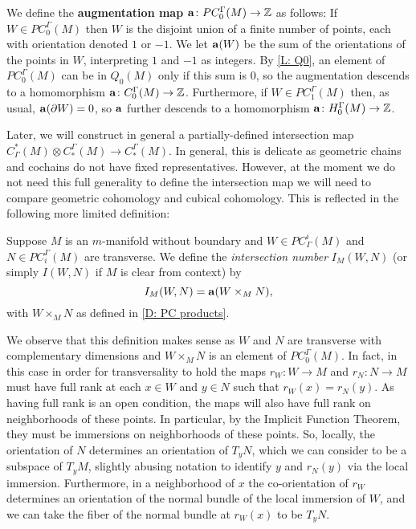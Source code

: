 \begin{definition}\label{D: aug}
	We define the \textbf{augmentation map} $\mathbf{a} \colon PC^\Gamma_0(M) \to \mathbb{Z}$ as follows: If $W \in PC^\Gamma_0(M)$ then $W$ is the disjoint union of a finite number of points, each with orientation denoted $1$ or $-1$.
	We let $\mathbf{a}(W)$ be the sum of the orientations of the points in $W$, interpreting $1$ and $-1$ as integers.
	By \cref{L: Q0}, an element of $PC^\Gamma_0(M)$ can be in $Q_0(M)$ only if this sum is $0$, so the augmentation descends to a homomorphism $\mathbf{a} \colon C^\Gamma_0(M) \to \mathbb{Z}$.
	Furthermore, if $W \in PC_1^\Gamma(M)$ then, as usual, $\mathbf{a}(\partial W) = 0$, so $\mathbf{a}$ further descends to a homomorphism $\mathbf{a} \colon H_0^\Gamma(M) \to \mathbb{Z}$.
\end{definition}

Later, we will construct in general a partially-defined intersection map $C^*_\Gamma(M) \otimes C_*^\Gamma(M) \to C_*^\Gamma(M)$.
In general, this is delicate as geometric chains and cochains do not have fixed representatives.
However, at the moment we do not need this full generality to define the intersection map we will need to compare geometric cohomology and cubical cohomology.
This is reflected in the following more limited definition:

\begin{definition}\label{D: intersection number}
	Suppose $M$ is an $m$-manifold without boundary and $W \in PC_\Gamma^i(M)$ and $N \in PC_{i}^\Gamma(M)$ are transverse.
	We define the \textit{intersection number} $I_M(W,N)$ (or simply $I(W,N)$ if $M$ is clear from context) by $$I_M(W,N) = \mathbf{a}(W \times_M N),$$ with $W \times_M N$ as defined in \cref{D: PC products}.
\end{definition}

We observe that this definition makes sense as $W$ and $N$ are transverse with complementary dimensions and $W \times_M N$ is an element of $PC_0^\Gamma(M)$.
In fact, in this case in order for transversality to hold the maps $r_W \colon W \to M$ and $r_N \colon N \to M$ must have full rank at each $x \in W$ and $y \in N$ such that $r_W(x) = r_N(y)$.
As having full rank is an open condition, the maps will also have full rank on neighborhoods of these points.
In particular, by the Implicit Function Theorem, they must be immersions on neighborhoods of these points.
So, locally, the orientation of $N$ determines an orientation of $T_yN$, which we can consider to be a subspace of $T_{y}M$, slightly abusing notation to identify $y$ and $r_N(y)$ via the local immersion.
Furthermore, in a neighborhood of $x$ the co-orientation of $r_W$ determines an orientation of the normal bundle of the local immersion of $W$, and we can take the fiber of the normal bundle at $r_W(x)$ to be $T_yN$.

